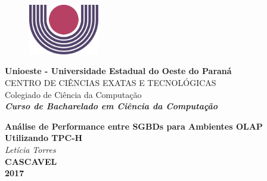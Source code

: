 


\begin{figure}
	\centering
	\includegraphics[width = 3.13cm, height = 2.19cm]{simbolo.jpg}
\end{figure}
\fontsize{13}{13}
\noindent
\textbf{Unioeste - Universidade Estadual do Oeste do Paraná}\\
\fontsize{11}{11}
CENTRO DE CIÊNCIAS EXATAS E TECNOLÓGICAS\\
Colegiado de Ciência da Computação\\
\textbf{\textit{Curso de Bacharelado em Ciência da Computação}}
\vspace{9cm}
\begin{center}
\fontsize{13}{13}
\textbf{Análise de Performance entre SGBDs para Ambientes OLAP Utilizando TPC-H}\\
\vspace{0.3cm}
\textit{Letícia Torres}\\
\vspace{9cm}
\textbf{CASCAVEL}\\
\textbf{2017}
\end{center}


